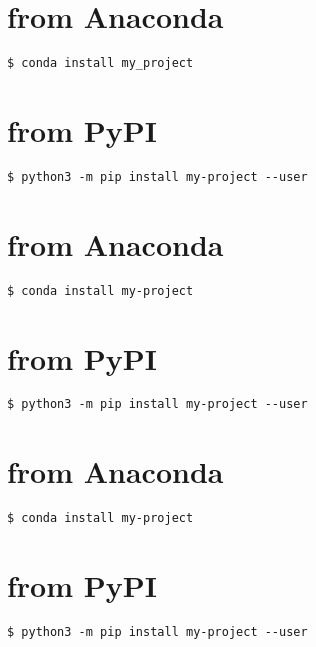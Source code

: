 \documentclass[letterpaper,10pt,english]{sphinxmanual}
\begin{document}
\chapter{from Anaconda}
\label{\detokenize{installation:installation-8-from_Anaconda}}
\begin{Verbatim}[commandchars=\\\{\}]
$ conda install my_project
\end{Verbatim}


\chapter{from PyPI}
\label{\detokenize{installation:installation-9-from_PyPI}}\label{\detokenize{installation:installation-9}}
\begin{Verbatim}[commandchars=\\\{\}]
$ python3 -m pip install my-project --user
\end{Verbatim}


\chapter{from Anaconda}
\label{\detokenize{installation:installation-9-from_Anaconda}}
\begin{Verbatim}[commandchars=\\\{\}]
$ conda install my-project
\end{Verbatim}


\chapter{from PyPI}
\label{\detokenize{installation:installation-10-from_PyPI}}\label{\detokenize{installation:installation-10}}
\begin{Verbatim}[commandchars=\\\{\}]
$ python3 -m pip install my-project --user
\end{Verbatim}


\chapter{from Anaconda}
\label{\detokenize{installation:installation-10-from_Anaconda}}
\begin{Verbatim}[commandchars=\\\{\}]
$ conda install my-project
\end{Verbatim}


\chapter{from PyPI}
\label{\detokenize{installation:installation-11-from_PyPI}}\label{\detokenize{installation:installation-11}}
\begin{Verbatim}[commandchars=\\\{\}]
$ python3 -m pip install my-project --user
\end{Verbatim}
\end{document}
